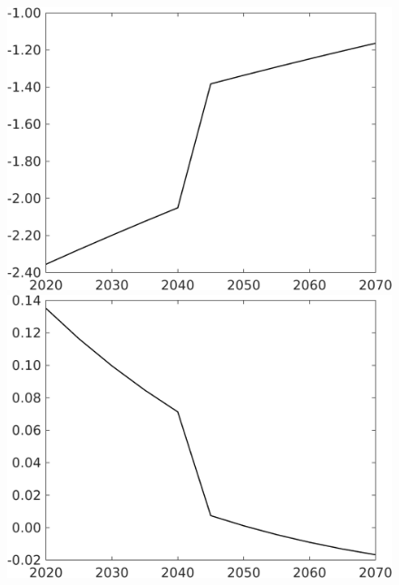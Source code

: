 \documentclass[12pt]{article}
\begin{document}
\begin{figure}[h!!]
\begin{minipage}[]{0.32\textwidth}
	\end{minipage}		
	\begin{minipage}[]{0.32\textwidth}
		\includegraphics[width=1\textwidth]{../../codding_model/own_basedOnFried/optimalPol_010922_revision/figures/all_13Sept22/CompTaufPER_bytaul_Reg0_gAg_spillover0_nsk0_xgr0_knspil1_sep1_LFlimit1_emsbase0_countec0_GovRev0_etaa0.79_lgd0.png}
	\end{minipage}
	\begin{minipage}[]{0.32\textwidth}
		\includegraphics[width=1\textwidth]{../../codding_model/own_basedOnFried/optimalPol_010922_revision/figures/all_13Sept22/CompTaufPER_bytaul_Reg0_gAn_spillover0_nsk0_xgr0_knspil1_sep1_LFlimit1_emsbase0_countec0_GovRev0_etaa0.79_lgd0.png}

\end{minipage}
\end{figure}
\end{document}
